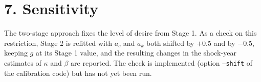 \documentclass[11pt]{article}
\begin{document}
\section*{7. Sensitivity}

The two-stage approach fixes the level of desire from Stage 1. As a check on this restriction, Stage 2 is refitted with $a_c$ and $a_k$ both shifted by $+0.5$ and by $-0.5$, keeping $g$ at its Stage 1 value, and the resulting changes in the shock-year estimates of $\kappa$ and $\beta$ are reported. The check is implemented (option \texttt{--shift} of the calibration code) but has not yet been run.
\end{document}
